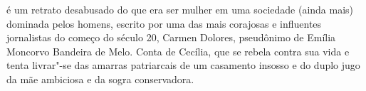 \hspace*{-7cm}\hrulefill\hspace*{-7cm}

\medskip

 é um retrato desabusado do que era ser mulher em uma sociedade (ainda mais) dominada pelos homens, escrito por uma das mais corajosas e influentes jornalistas do começo do século 20, Carmen Dolores, pseudônimo de Emília Moncorvo Bandeira de Melo. Conta de Cecília, que se rebela contra sua vida e tenta livrar"-se das amarras patriarcais de um casamento insosso e do duplo jugo da mãe ambiciosa e da sogra conservadora.

\vfill

\hspace*{-.4cm}\begin{minipage}[c]{0.45\linewidth}
\small{
{}}
\end{minipage}

\pagebreak


